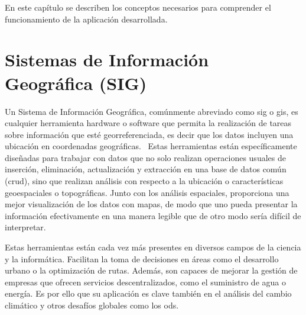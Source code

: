 
En este capítulo se describen los conceptos necesarios para comprender el funcionamiento de la aplicación desarrollada.

\section{Sistemas de Información Geográfica (SIG)}
	Un Sistema de Información Geográfica, comúnmente abreviado como \acrshort{sig} o \acrshort{gis}, es cualquier herramienta hardware o software que permita la realización de tareas sobre información que esté georreferenciada, es decir que los datos incluyen una ubicación en coordenadas geográficas.~\cite{qgis_introduction_gis}
	Estas herramientas están específicamente diseñadas para trabajar con datos que no solo realizan operaciones usuales de inserción, eliminación, actualización y extracción en una base de datos común (\acrshort{crud}), sino que realizan análisis con respecto a la ubicación o características geoespaciales o topográficas. Junto con los análisis espaciales, proporciona una mejor visualización de los datos con mapas, de modo que uno pueda presentar la información efectivamente en una manera legible que de otro modo sería difícil de interpretar.
	 
	Estas herramientas están cada vez más presentes en diversos campos de la ciencia y la informática. Facilitan la toma de decisiones en áreas como el desarrollo urbano o la optimización de rutas. Además, son capaces de mejorar la gestión de empresas que ofrecen servicios descentralizados, como el suministro de agua o energía. Es por ello que su aplicación es clave también en el análisis del cambio climático y otros desafíos globales como los \acrlong{ods}.
	
